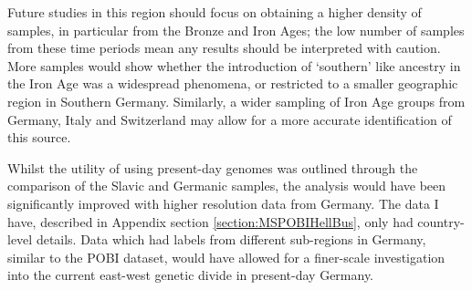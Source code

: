 Future studies in this region should focus on obtaining a higher density of samples, in particular from the Bronze and Iron Ages; the low number of samples from these time periods mean any results should be interpreted with caution. More samples would show whether the introduction of `southern' like ancestry in the Iron Age was a widespread phenomena, or restricted to a smaller geographic region in Southern Germany. Similarly, a wider sampling of Iron Age groups from Germany, Italy and Switzerland may allow for a more accurate identification of this source.

Whilst the utility of using present-day genomes was outlined through the comparison of the Slavic and Germanic samples, the analysis would have been significantly improved with higher resolution data from Germany. The data I have, described in Appendix section \ref{section:MSPOBIHellBus}, only had country-level details. Data which had labels from different sub-regions in Germany, similar to the POBI dataset, would have allowed for a finer-scale investigation into the current east-west genetic divide in present-day Germany.    

